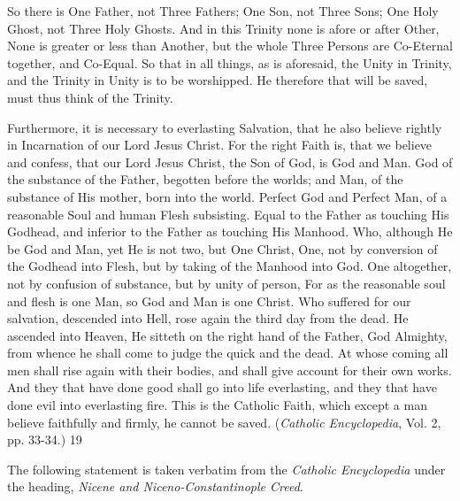 So there is One Father, not Three Fathers; One Son, not Three Sons; One Holy Ghost, not
Three Holy Ghosts. And in this Trinity none is afore or after Other, None is greater or less
than Another, but the whole Three Persons are Co-Eternal together, and Co-Equal. So that in
all things, as is aforesaid, the Unity in Trinity, and the Trinity in Unity is to be worshipped.
He therefore that will be saved, must thus think of the Trinity.

Furthermore, it is necessary to everlasting Salvation, that he also believe rightly in
Incarnation of our Lord Jesus Christ. For the right Faith is, that we believe and confess, that
our Lord Jesus Christ, the Son of God, is God and Man. God of the substance of the Father,
begotten before the worlds; and Man, of the substance of His mother, born into the world.
Perfect God and Perfect Man, of a reasonable Soul and human Flesh subsisting. Equal to the
Father as touching His Godhead, and inferior to the Father as touching His Manhood. Who,
although He be God and Man, yet He is not two, but One Christ, One, not by conversion of
the Godhead into Flesh, but by taking of the Manhood into God. One altogether, not by
confusion of substance, but by unity of person, For as the reasonable soul and flesh is one
Man, so God and Man is one Christ. Who suffered for our salvation, descended into Hell,
rose again the third day from the dead. He ascended into Heaven, He sitteth on the right hand
of the Father, God Almighty, from whence he shall come to judge the quick and the dead. At
whose coming all men shall rise again with their bodies, and shall give account for their own
works. And they that have done good shall go into life everlasting, and they that have done
evil into everlasting fire. This is the Catholic Faith, which except a man believe faithfully and
firmly, he cannot be saved. (\textit{Catholic Encyclopedia}, Vol. 2, pp. 33-34.) 19

The following statement is taken verbatim from the \textit{Catholic Encyclopedia} under the
heading, \textit{Nicene and Niceno-Constantinople Creed}.

